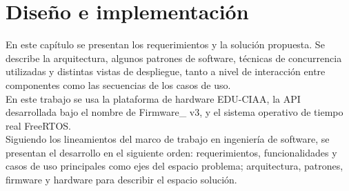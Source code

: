 \chapter{Diseño e implementación} %

En este capítulo se presentan los requerimientos y la solución propuesta. Se describe la arquitectura, algunos patrones de software, técnicas de concurrencia utilizadas y distintas vistas de despliegue, tanto a nivel de interacción entre componentes como las secuencias de los casos de uso.\\

 En este trabajo se usa la plataforma de hardware EDU-CIAA\cite{CIAA}, la API desarrollada bajo el nombre de Firmware\_ v3\cite{firmwareV3}, y el sistema operativo de tiempo real FreeRTOS\cite{freeRTOS}.\\

Siguiendo los lineamientos del marco de trabajo en ingeniería de software, se presentan el desarrollo en el siguiente orden: requerimientos, funcionalidades y casos de uso principales como ejes del espacio problema; arquitectura, patrones, firmware y hardware para describir el espacio solución.\\


\label{Chapter3} %


